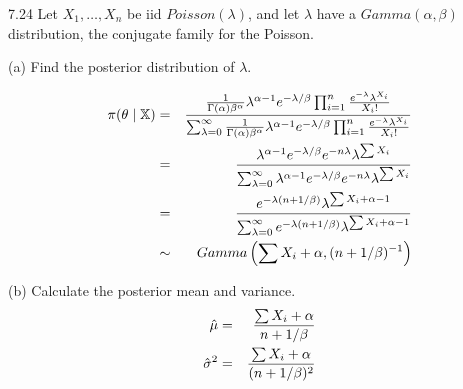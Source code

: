 \documentclass[12pt]{article}
\begin{document}
7.24
Let $X_1,\ldots,X_n$ be iid $Poisson(\lambda)$, and let $\lambda$
have a $Gamma(\alpha,\beta)$ distribution, the conjugate family
for the Poisson.

\bigskip
\noindent
(a) Find the posterior distribution of $\lambda$.

\begin{eqnarray*}
\pi(\theta\mid\mathbb X)&=&
{
{1\over\Gamma(\alpha)\beta^\alpha}
\lambda^{\alpha-1}
e^{-\lambda/\beta}
\prod_{i=1}^n
{e^{-\lambda}\lambda^{X_i}\over X_i!}
}
\over
\sum_{\lambda=0}^\infty
{
{1\over\Gamma(\alpha)\beta^\alpha}
\lambda^{\alpha-1}
e^{-\lambda/\beta}
\prod_{i=1}^n
{e^{-\lambda}\lambda^{X_i}\over X_i!}
}\\
&=&
{
\lambda^{\alpha-1}
e^{-\lambda/\beta}
e^{-n\lambda}
\lambda^{\sum X_i}
}
\over
\sum_{\lambda=0}^\infty
{
\lambda^{\alpha-1}
e^{-\lambda/\beta}
e^{-n\lambda}
\lambda^{\sum X_i}
}\\
&=&
{
e^{-\lambda(n+1/\beta)}
\lambda^{\sum X_i+\alpha-1}
}
\over
\sum_{\lambda=0}^\infty
{
e^{-\lambda(n+1/\beta)}
\lambda^{\sum X_i+\alpha-1}
}\\
&\sim&Gamma\left(\sum X_i+\alpha,(n+1/\beta)^{-1}\right)
\end{eqnarray*}

\bigskip
\noindent
(b) Calculate the posterior mean and variance.
\begin{eqnarray*}
\hat\mu&=&{\sum X_i+\alpha\over n+1/\beta}\\
\hat\sigma^2&=&{\sum X_i+\alpha\over(n+1/\beta)^2}
\end{eqnarray*}
\end{document}
